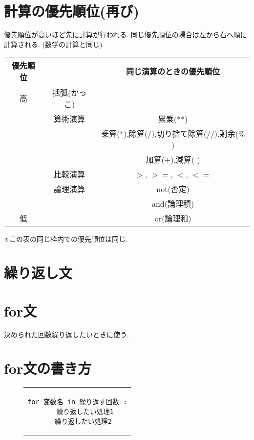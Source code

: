 \documentclass[dvipdfmx]{jsbook}
\newcommand{\countup}[1]{\setcounter{chapter}{#1} \setcounter{section}{0}}
\begin{document}
\section{計算の優先順位(再び)}
優先順位が高いほど先に計算が行われる. 同じ優先順位の場合は左から右へ順に計算される. (数学の計算と同じ) \par
\begin{tabular}[t]{|c|c|c|}
	\hline
	優先順位 &              & 同じ演算のときの優先順位                    \\
	\hline \hline
	高       & 括弧(かっこ) &                                             \\ \hline
	         & 算術演算     & 累乗(**)                                    \\ \hline
	         &              & 乗算(*),除算(/),切り捨て除算(//),剰余($\%$) \\ \hline
	         &              & 加算(+),減算(-)                             \\ \hline
	         & 比較演算     & $>$, $>=$,  $<$,  $<=$                      \\ \hline
	         & 論理演算     & not(否定)                                   \\ \hline
	         &              & and(論理積)                                 \\ \hline
	低       &              & or(論理和)                                  \\ \hline
\end{tabular} \par
※この表の同じ枠内での優先順位は同じ.

\newpage
\section*{繰り返し文}
\countup{5}
\section{for文}
決められた回数繰り返したいときに使う.
\section{for文の書き方}
\begin{figure}[htp]
	\begin{tabular}{c}
		\begin{minipage}{.35\textwidth}
			\begin{lstlisting}[caption=for文の基本構文]
for 変数名 in 繰り返す回数 :
	繰り返したい処理1
	繰り返したい処理2 \end{lstlisting}
		\end{minipage}
	\end{tabular}
\end{figure}
\end{document}
